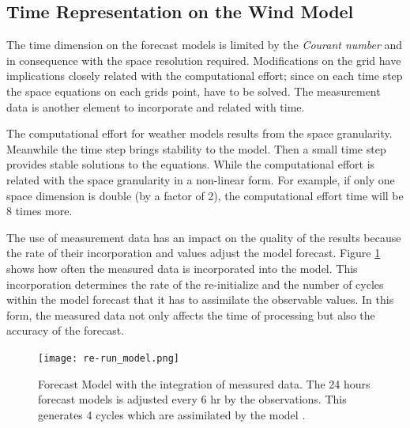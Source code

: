 \subsection{Time Representation on the Wind Model}
The time dimension on the forecast models is limited by the \textit{Courant number} and in consequence with the space resolution required. Modifications on the grid have implications closely related with the computational effort; since on each time step the space equations on each grids point, have to be solved. The measurement data is another element to incorporate and related with time. \par 

The computational effort for weather models results from the space granularity. Meanwhile the time step brings stability to the model. Then a small time step provides stable solutions to the equations. 
While the computational effort is related with the space granularity in a non-linear form. For example, if only one space dimension is double (by a factor of 2), the computational effort time will be 8 times more. \par 
The use of measurement data has an impact on the quality of the results because the rate of their incorporation and values adjust the model forecast. Figure \ref{fig:data_meas_integration} shows how often the measured data is incorporated into the model. This incorporation determines the rate of the re-initialize and the number of cycles %
within the model forecast that it has to assimilate the observable values. %
In this form, the measured data %
not only affects the time of processing but also the accuracy of the forecast. \par %
\begin{figure}
    \centering
    \texttt{[image: re-run\_model.png]}
    \caption{Forecast Model with the integration of measured data. The 24 hours forecast models is adjusted every 6 hr by the observations. This generates 4 cycles which are assimilated by the model \cite{warner2010numerical}. }
    \label{fig:data_meas_integration}
\end{figure}

